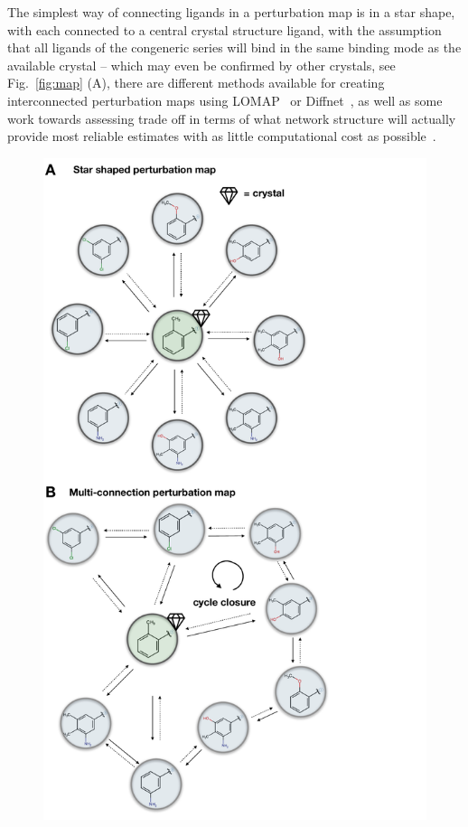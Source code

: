 \documentclass[9pt,bestpractices]{livecoms}
\begin{document}
The simplest way of connecting ligands in a perturbation map is in a star shape, with each connected to a central crystal structure ligand, with the assumption that all ligands of the congeneric series will bind in the same binding mode as the available crystal -- which may even be confirmed by other crystals, see Fig.~\ref{fig:map} (A), there are different methods available for creating interconnected perturbation maps using LOMAP~\cite{liu_lead_2013} or Diffnet~\cite{xu_optimal_2019}, as well as some work towards assessing trade off in terms of what network structure will actually provide most reliable estimates with as little computational cost as possible~\cite{yang_optimal_2020, xu_optimal_2019}.

\begin{figure}
    \includegraphics[width=0.95\linewidth]{figures/network.pdf}

\end{figure}
\end{document}
